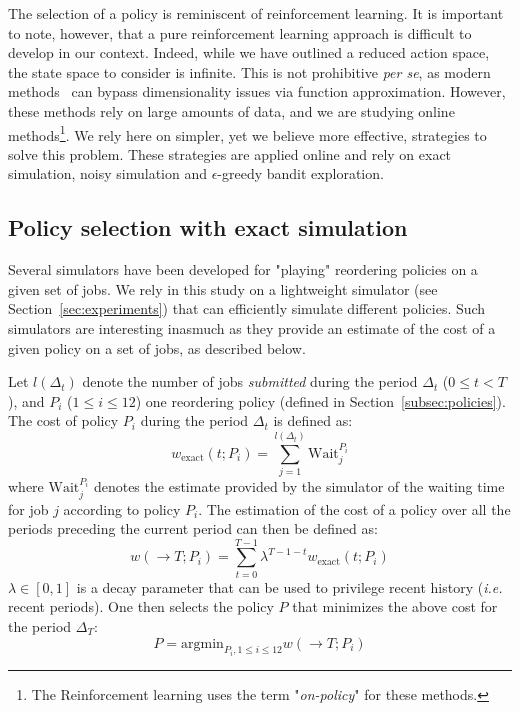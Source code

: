 \documentclass[sigconf,anonymous]{acmart}
\begin{document}
The selection of a policy is reminiscent of reinforcement learning.  It is
important to note, however, that a pure reinforcement learning approach is
difficult to develop in our context. Indeed, while we have outlined a reduced
action space, the state space to consider is infinite. This is not prohibitive
\textit{per se}, as modern methods~\cite{aprl} can bypass dimensionality issues
via function approximation. However, these methods rely on large amounts of
data, and we are studying online methods\footnote{The Reinforcement learning
  uses the term "\textit{on-policy}" for these methods.}. We rely here on
  simpler, yet we believe more effective, strategies to solve this problem.
  These strategies are applied online and rely on exact simulation, noisy
  simulation and $\epsilon$-greedy bandit exploration.

\subsection{Policy selection with exact simulation}
\label{sub:feedback}

Several simulators have been developed for "playing" reordering policies on a
given set of jobs. We rely in this study on a lightweight simulator (see
Section~\ref{sec:experiments}) that can efficiently simulate different
policies. Such simulators are interesting inasmuch as they provide an estimate
of the cost of a given policy on a set of jobs, as described below.

Let $l(\Delta_t)$ denote the number of jobs \textit{submitted} during the
period $\Delta_t$ ($0 \le t < T$), and $P_i$ ($1 \le i \le 12$) one reordering
policy (defined in Section~\ref{subsec:policies}). The cost of policy $P_i$
during the period $\Delta_t$ is defined as:
%
\begin{equation} \label{eq:cost-exact} w_{\mbox{exact}}(t;P_i) =
\sum_{j=1}^{l(\Delta_t)} \mbox{Wait}_j^{P_i} \end{equation}
%
where $\mbox{Wait}_j^{P_i}$ denotes the estimate provided by the simulator of
the waiting time for job $j$ according to policy $P_i$. The estimation of the
cost of a policy over all the periods preceding the current period can then be
defined as:
%
\begin{equation} \label{eq:tot-cost-exact} w(\rightarrow T;P_i) =
\sum_{t=0}^{T-1} \lambda^{T-1-t} w_{\mbox{exact}}(t;P_i) \end{equation}
%
$\lambda \in [0,1]$ is a decay parameter that can be used to privilege recent
history (\textit{i.e.} recent periods). One then selects the policy $P$ that
minimizes the above cost for the period $\Delta_T$:
%
\begin{equation} \label{eq:select-exact} P = \mbox{argmin}_{P_i, 1 \le i \le
12} w(\rightarrow T;P_i) \end{equation}
\end{document}
